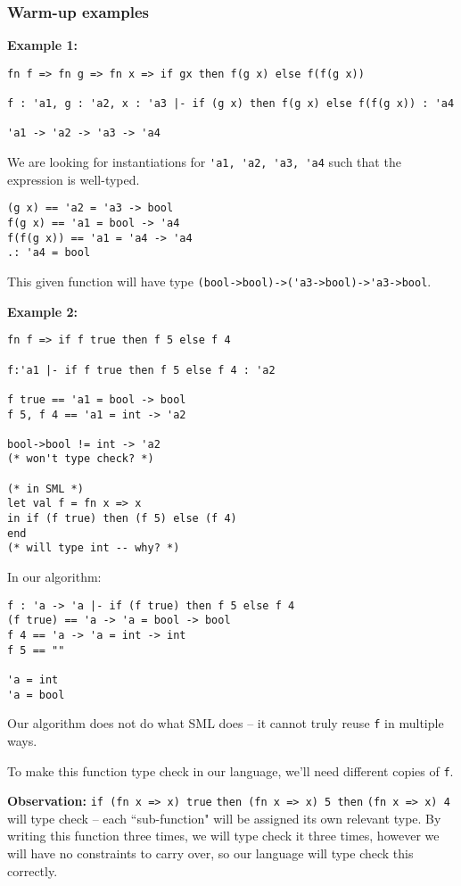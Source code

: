 \documentclass[11pt]{article}
\begin{document}
\subsubsection{Warm-up examples}

\textbf{Example 1:}
\begin{verbatim}
fn f => fn g => fn x => if gx then f(g x) else f(f(g x))

f : 'a1, g : 'a2, x : 'a3 |- if (g x) then f(g x) else f(f(g x)) : 'a4

'a1 -> 'a2 -> 'a3 -> 'a4
\end{verbatim}

We are looking for instantiations for \verb~'a1, 'a2, 'a3, 'a4~ such that the expression is well-typed.

\begin{verbatim}
(g x) == 'a2 = 'a3 -> bool
f(g x) == 'a1 = bool -> 'a4
f(f(g x)) == 'a1 = 'a4 -> 'a4
.: 'a4 = bool
\end{verbatim}

This given function will have type \verb~(bool->bool)->('a3->bool)->'a3->bool~.

\textbf{Example 2:}
\begin{verbatim}
fn f => if f true then f 5 else f 4

f:'a1 |- if f true then f 5 else f 4 : 'a2

f true == 'a1 = bool -> bool
f 5, f 4 == 'a1 = int -> 'a2

bool->bool != int -> 'a2
(* won't type check? *)

(* in SML *)
let val f = fn x => x
in if (f true) then (f 5) else (f 4)
end
(* will type int -- why? *)
\end{verbatim}

In our algorithm:
\begin{verbatim}
f : 'a -> 'a |- if (f true) then f 5 else f 4
(f true) == 'a -> 'a = bool -> bool
f 4 == 'a -> 'a = int -> int
f 5 == ""

'a = int
'a = bool
\end{verbatim}

Our algorithm does not do what SML does -- it cannot truly reuse \verb~f~ in multiple ways.

To make this function type check in our language, we'll need different copies of \verb~f~.

\textbf{Observation:} \verb~if (fn x => x) true~ \verb~then (fn x => x) 5 then~ \verb~(fn x => x) 4~ will type check -- each ``sub-function" will be assigned its own relevant type. By writing this function three times, we will type check it three times, however we will have no constraints to carry over, so our language will type check this correctly.
\end{document}
